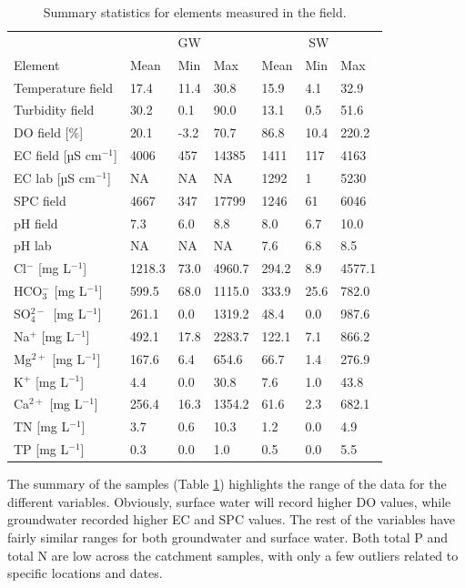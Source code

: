 \documentclass[, manuscript]{copernicus}
\begin{document}
\begin{table}
\centering
\caption{\label{tab:TableElementstats}Summary statistics for elements measured in the field.}
\centering
\begin{tabular}[t]{l|l|l|l|l|l|l}
\hline
\multicolumn{1}{c|}{} & \multicolumn{3}{c|}{GW} & \multicolumn{3}{c}{SW} \\
\cline{2-4} \cline{5-7}
Element & Mean & Min & Max & Mean & Min & Max\\
\hline
Temperature field & 17.4 & 11.4 & 30.8 & 15.9 & 4.1 & 32.9\\
\hline
Turbidity field & 30.2 & 0.1 & 90.0 & 13.1 & 0.5 & 51.6\\
\hline
DO field [\%] & 20.1 & -3.2 & 70.7 & 86.8 & 10.4 & 220.2\\
\hline
EC field [µS cm$^{-1}$] & 4006 & 457 & 14385 & 1411 & 117 & 4163\\
\hline
EC lab [µS cm$^{-1}$] & NA & NA & NA & 1292 & 1 & 5230\\
\hline
SPC field & 4667 & 347 & 17799 & 1246 & 61 & 6046\\
\hline
pH field & 7.3 & 6.0 & 8.8 & 8.0 & 6.7 & 10.0\\
\hline
pH lab & NA & NA & NA & 7.6 & 6.8 & 8.5\\
\hline
Cl$^-$ [mg L$^{-1}$] & 1218.3 & 73.0 & 4960.7 & 294.2 & 8.9 & 4577.1\\
\hline
HCO$_3^-$ [mg L$^{-1}$] & 599.5 & 68.0 & 1115.0 & 333.9 & 25.6 & 782.0\\
\hline
SO$_4^{2-}$~[mg L$^{-1}$] & 261.1 & 0.0 & 1319.2 & 48.4 & 0.0 & 987.6\\
\hline
Na$^{+}$ [mg L$^{-1}$] & 492.1 & 17.8 & 2283.7 & 122.1 & 7.1 & 866.2\\
\hline
Mg$^{2+}$ [mg L$^{-1}$] & 167.6 & 6.4 & 654.6 & 66.7 & 1.4 & 276.9\\
\hline
K$^{+}$ [mg L$^{-1}$] & 4.4 & 0.0 & 30.8 & 7.6 & 1.0 & 43.8\\
\hline
Ca$^{2+}$ [mg L$^{-1}$] & 256.4 & 16.3 & 1354.2 & 61.6 & 2.3 & 682.1\\
\hline
TN [mg L$^{-1}$] & 3.7 & 0.6 & 10.3 & 1.2 & 0.0 & 4.9\\
\hline
TP [mg L$^{-1}$] & 0.3 & 0.0 & 1.0 & 0.5 & 0.0 & 5.5\\
\hline
\end{tabular}
\end{table}

The summary of the samples (Table \ref{tab:TableElementstats})
highlights the range of the data for the different variables. Obviously,
surface water will record higher DO values, while groundwater recorded
higher EC and SPC values. The rest of the variables have fairly similar
ranges for both groundwater and surface water. Both total P and total N
are low across the catchment samples, with only a few outliers related
to specific locations and dates.
\end{document}
